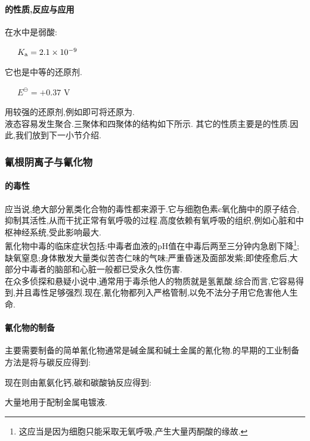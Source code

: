 \documentclass{ctexart}
\begin{document}
\paragraph{的性质,反应与应用}
在水中是弱酸:
\begin{center}
    \ \ \ $K_{\text a}=2.1\times10^{-9}$
\end{center}
它也是中等的还原剂.
\begin{center}
    \ \ \ $E^\ominus=+0.37\text{ V}$
\end{center}
用较强的还原剂,例如即可将还原为.\\
\indent 液态容易发生聚合.三聚体和四聚体的结构如下所示.
\indent 其它的性质主要是的性质.因此,我们放到下一小节介绍.
\subsubsection{氰根阴离子与氰化物}
\paragraph{的毒性}
应当说,绝大部分氰类化合物的毒性都来源于.它与细胞色素c氧化酶中的原子结合,抑制其活性,从而干扰正常有氧呼吸的过程.高度依赖有氧呼吸的组织,例如心脏和中枢神经系统,受此影响最大.\\
\indent 氰化物中毒的临床症状包括:中毒者血液的pH值在中毒后两至三分钟内急剧下降\footnote{这应当是因为细胞只能采取无氧呼吸,产生大量丙酮酸的缘故.};缺氧窒息;身体散发大量类似苦杏仁味的气味;严重昏迷及面部发紫;即使痊愈后,大部分中毒者的脑部和心脏一般都已受永久性伤害.\\
\indent 在众多侦探和悬疑小说中,通常用于毒杀他人的物质就是氢氰酸.综合而言,它容易得到,并且毒性足够强烈.现在,氰化物都列入严格管制,以免不法分子用它危害他人生命.
\paragraph{氰化物的制备}
主要需要制备的简单氰化物通常是碱金属和碱土金属的氰化物.的早期的工业制备方法是将与碳反应得到:
\begin{center}
\end{center}
现在则由氰氨化钙,碳和碳酸钠反应得到:
\begin{center}
\end{center}
大量地用于配制金属电镀液.
\end{document}
